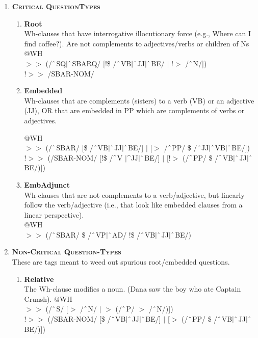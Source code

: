 \begin{enumerate}
    \item[] \textbf{\textsc{Critical QuestionTypes}}
        \begin{enumerate}
            \item \textbf{Root}\\
            Wh-clauses that have interrogative illocutionary force (e.g., \textsf{Where can I find coffee?}). Are not complements to adjectives/verbs or children of Ns\\
            @WH \\
            $>\!\!>$ (/$\string^$SQ$|\string^$SBARQ/ [!\$ /$\string^$VB$|\string^$JJ$|\string^$BE/ $|$ !$>$ /$\string^$N/]) \\
            !$>\!\!>$ /SBAR-NOM/

            \item \textbf{Embedded}\\ 
            Wh-clauses that are complements (sisters) to a verb (VB) or an adjective (JJ), OR that are embedded in PP which are complements of verbs or adjectives.

            @WH \\
            $>\!\!>$ ($/\string^$SBAR/ [\$ /$\string^$VB$|\string^$JJ$|\string^$BE/] $|$ [$>$ /$\string^$PP/ \$ /$\string^$JJ$|\string^$VB$|\string^$BE/]) \\
            !$>\!\!>$ (/SBAR-NOM/ [!\$ /$\string^$V $|$\string^JJ$|\string^$BE/] $|$ [!$>$ (/$\string^$PP/ \$ /$\string^$VB$|\string^$JJ$|\string^$BE/)])

            \item \textbf{EmbAdjunct}\\
            Wh-clauses that are not complements to a verb/adjective, but linearly follow the verb/adjective (i.e., that look like embedded clauses from a linear perspective).\\
            @WH\\ 
            $>\!\!>$ (/$\string^$SBAR/ \$ /$\string^$VP$|\string^$AD/ !\$ /$\string^$VB$|\string^$JJ$|\string^$BE/)
            
            \end{enumerate}
        \item[] \textbf{\textsc{Non-Critical Question-Types}}\\
        These are tags meant to weed out spurious root/embedded questions.

        \begin{enumerate}
            \item \textbf{Relative}\\
            The Wh-clause modifies a noun. (\textsf{Dana saw the boy who ate Captain Crunsh}).
            @WH \\
            $>\!\!>$ (/$\string^$S/ [$>$ /$\string^$N/ $|$ $>$ (/$\string^$P/ $>$ /$\string^$N/)]) \\
            !$>\!\!>$ (/SBAR-NOM/ [\$ /$\string^$VB$|\string^$JJ$|\string^$BE/] $|$ [$>$ (/$\string^$PP/ \$ /$\string^$VB$|\string^$JJ$|\string^$BE/)])


\end{enumerate}
\end{enumerate}
